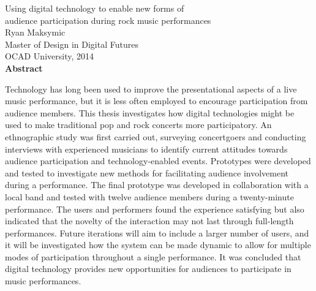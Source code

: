 \begin{center}
{Using digital technology to enable new forms of\\audience participation during rock music performances\\[0.25cm]
Ryan Maksymic\\[0.25cm]
Master of Design in Digital Futures\\[0.25cm]
OCAD University, 2014\\[0.75cm]
\large\textbf{Abstract}}\\
\end{center}

Technology has long been used to improve the presentational aspects of a live music performance, but it is less often employed to encourage participation from audience members. This thesis investigates how digital technologies might be used to make traditional pop and rock concerts more participatory. An ethnographic study was first carried out, surveying concertgoers and conducting interviews with experienced musicians to identify current attitudes towards audience participation and technology-enabled events. Prototypes were developed and tested to investigate new methods for facilitating audience involvement during a performance. The final prototype was developed in collaboration with a local band and tested with twelve audience members during a twenty-minute performance. The users and performers found the experience satisfying but also indicated that the novelty of the interaction may not last through full-length performances. Future iterations will aim to include a larger number of users, and it will be investigated how the system can be made dynamic to allow for multiple modes of participation throughout a single performance. It was concluded that digital technology provides new opportunities for audiences to participate in music performances.

